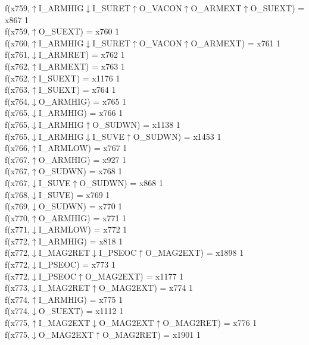 f(x759,$\uparrow$I\_ARMHIG$\downarrow$I\_SURET$\uparrow$O\_VACON$\uparrow$O\_ARMEXT$\uparrow$O\_SUEXT) = x867 {1} \\
f(x759,$\uparrow$O\_SUEXT) = x760 {1} \\
f(x760,$\uparrow$I\_ARMHIG$\downarrow$I\_SURET$\uparrow$O\_VACON$\uparrow$O\_ARMEXT) = x761 {1} \\
f(x761,$\downarrow$I\_ARMRET) = x762 {1} \\
f(x762,$\uparrow$I\_ARMEXT) = x763 {1} \\
f(x762,$\uparrow$I\_SUEXT) = x1176 {1} \\
f(x763,$\uparrow$I\_SUEXT) = x764 {1} \\
f(x764,$\downarrow$O\_ARMHIG) = x765 {1} \\
f(x765,$\downarrow$I\_ARMHIG) = x766 {1} \\
f(x765,$\downarrow$I\_ARMHIG$\uparrow$O\_SUDWN) = x1138 {1} \\
f(x765,$\downarrow$I\_ARMHIG$\downarrow$I\_SUVE$\uparrow$O\_SUDWN) = x1453 {1} \\
f(x766,$\uparrow$I\_ARMLOW) = x767 {1} \\
f(x767,$\uparrow$O\_ARMHIG) = x927 {1} \\
f(x767,$\uparrow$O\_SUDWN) = x768 {1} \\
f(x767,$\downarrow$I\_SUVE$\uparrow$O\_SUDWN) = x868 {1} \\
f(x768,$\downarrow$I\_SUVE) = x769 {1} \\
f(x769,$\downarrow$O\_SUDWN) = x770 {1} \\
f(x770,$\uparrow$O\_ARMHIG) = x771 {1} \\
f(x771,$\downarrow$I\_ARMLOW) = x772 {1} \\
f(x772,$\uparrow$I\_ARMHIG) = x818 {1} \\
f(x772,$\downarrow$I\_MAG2RET$\downarrow$I\_PSEOC$\uparrow$O\_MAG2EXT) = x1898 {1} \\
f(x772,$\downarrow$I\_PSEOC) = x773 {1} \\
f(x772,$\downarrow$I\_PSEOC$\uparrow$O\_MAG2EXT) = x1177 {1} \\
f(x773,$\downarrow$I\_MAG2RET$\uparrow$O\_MAG2EXT) = x774 {1} \\
f(x774,$\uparrow$I\_ARMHIG) = x775 {1} \\
f(x774,$\downarrow$O\_SUEXT) = x1112 {1} \\
f(x775,$\uparrow$I\_MAG2EXT$\downarrow$O\_MAG2EXT$\uparrow$O\_MAG2RET) = x776 {1} \\
f(x775,$\downarrow$O\_MAG2EXT$\uparrow$O\_MAG2RET) = x1901 {1} \\
